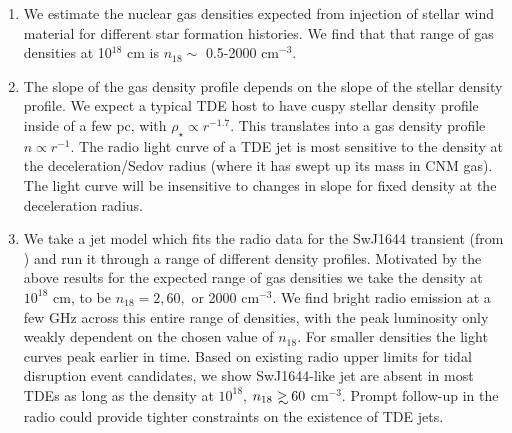 \documentclass[usenatbib,fleqn]{mnras}
\newcommand\gsim{\mathrel{\rlap{\lower4pt\hbox{\hskip1pt$\sim$}}
    \raise1pt\hbox{$>$}}}
\newcommand{\Mbh}[1][]{M_{\bullet1}}
\newcommand{\Msun}{{\rm M_\odot}}
\begin{document}
\begin{enumerate}
\item We estimate the nuclear gas densities expected from injection of
  stellar wind material for different star formation histories. We
  find that that range of gas densities at 10$^{18}$ cm is $n_{18}
  \sim$ 0.5-2000 cm$^{-3}$.

\item The slope of the gas density profile depends on the slope of the
  stellar density profile. We expect a typical TDE host to have cuspy
  stellar density profile inside of a few pc, with $\rho_\star
  \propto r^{-1.7}$. This translates into a gas density profile $n
  \propto r^{-1}$. The radio light curve of a TDE jet is most
  sensitive to the density at the deceleration/Sedov radius (where it
  has swept up its mass in CNM gas). The light curve will be
  insensitive to changes in slope for fixed density at the
  deceleration radius.


\item We take a jet model which fits the radio data for the SwJ1644
  transient (from \citealt{Mimica+2015}) and run it through a range of
  different density profiles. Motivated by the above results for the
  expected range of gas densities we take the density at $10^{18}$ cm,
  to be $n_{18}=2, 60,$ or 2000 cm$^{-3}$. We find bright radio
  emission at a few GHz across this entire range of densities, with
  the peak luminosity only weakly dependent on the chosen value of
  $n_{18}$.  For smaller densities the light curves peak earlier in
  time. Based on existing radio upper limits for tidal disruption
  event candidates, we show SwJ1644-like jet are absent in most TDEs
  as long as the density at $10^{18}$, $n_{18} \gsim  60$
  cm$^{-3}$. Prompt follow-up in the radio could provide tighter
  constraints on the existence of TDE jets.  
\end{enumerate}
\end{document}
